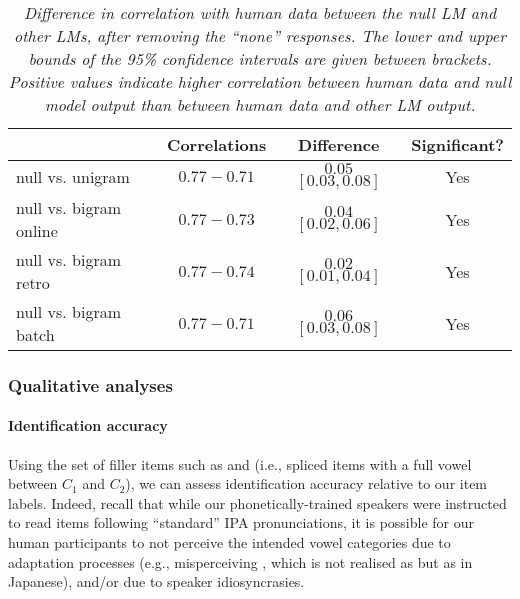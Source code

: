 {%
\begin{table}[htb!]
\centering
\caption{\textit{Difference in correlation with human data between the null LM and other LMs, after removing the ``none'' responses. The lower and upper bounds of the 95\% confidence intervals are given between brackets. Positive values indicate higher correlation between human data and null model output than between human data and other LM output.}}
\label{tab:m-ahpa-cor_diff-nonone}
\vspace{0.25cm}
\begin{tabular}{lccc}
   \toprule
  & Correlations & Difference & Significant? \\  \midrule
  null vs. unigram & $0.77 - 0.71$ & $0.05$ $[0.03, 0.08]$ & Yes  \\  
  null vs. bigram online & $0.77 - 0.73$ & $0.04$ $[0.02, 0.06]$ & Yes \\   
  null vs. bigram retro & $0.77 - 0.74$ & $0.02$ $[0.01, 0.04]$ & Yes \\ 
  null vs. bigram batch & $0.77 - 0.71$ & $0.06$ $[0.03, 0.08]$ & Yes \\ \bottomrule 
\end{tabular}
\end{table}

\subsubsection{Qualitative analyses}

\paragraph{Identification accuracy}
Using the set of filler items such as  and  (i.e., spliced items with a full vowel between $C_1$ and $C_2$), we can assess identification accuracy relative to our item labels. Indeed, recall that while our phonetically-trained speakers were instructed to read items following ``standard'' IPA pronunciations, it is possible for our human participants to not perceive the intended vowel categories due to adaptation processes (e.g., misperceiving , which is not realised as \textipa{[u]} but as \textipa{[W]} in Japanese), and/or due to speaker idiosyncrasies.

}
